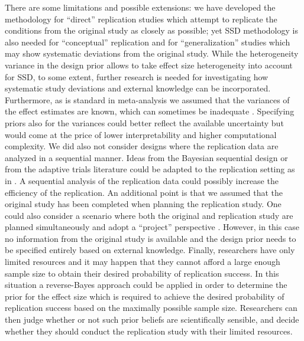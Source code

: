 There are some limitations and possible extensions: we have developed the
methodology for ``direct'' replication studies \citep{Simons2014} which attempt
to replicate the conditions from the original study as closely as possible; yet
SSD methodology is also needed for ``conceptual'' replication and for
``generalization'' studies which may show systematic deviations from the
original study. While the heterogeneity variance in the design prior allows to
take effect size heterogeneity into account for SSD, to some extent, further
research is needed for investigating how systematic study deviations and
external knowledge can be incorporated. Furthermore, as is standard in
meta-analysis we assumed that the variances of the effect estimates are known,
which can sometimes be inadequate \citep{Jackson2018}. Specifying priors also
for the variances could better reflect the available uncertainty but would come
at the price of lower interpretability and higher computational complexity. We
did also not consider designs where the replication data are analyzed in a
sequential manner. Ideas from the Bayesian sequential design
\citep{Schoenbrodt2017, Stefan2022} or from the adaptive trials literature
\citep{Bretz2009} could be adapted to the replication setting as in
\citet{Micheloud2020}. A sequential analysis of the replication data could
possibly increase the efficiency of the replication. An additional point is that
we assumed that the original study has been completed when planning the
replication study. One could also consider a scenario where both the original
and replication study are planned simultaneously and adopt a ``project''
perspective \citep{Maca2002, Held2021}. However, in this case no information from
the original study is available and the design prior needs to be specified
entirely based on external knowledge. Finally, researchers have only limited
resources and it may happen that they cannot afford a large enough sample size
to obtain their desired probability of replication success. In this situation a
reverse-Bayes approach \citep{Held2021b} could be applied in order to determine
the prior for the effect size which is required to achieve the desired
probability of replication success based on the maximally possible sample size.
Researchers can then judge whether or not such prior beliefs are scientifically
sensible, and decide whether they should conduct the replication study with
their limited resources.

